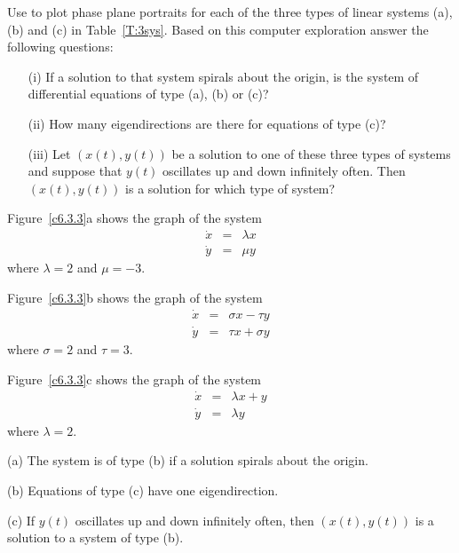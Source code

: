 \documentclass{ximera}
\begin{document}
\begin{computerExercise} \label{c6.3.3}
Use {\pplane} to plot phase plane portraits for each of the
three types of linear systems (a), (b) and (c) in Table~\ref{T:3sys}.
Based on this computer exploration answer the following questions:
\begin{itemize}
\item[(i)]  If a solution to that system spirals about the origin,
is the system of differential equations of type (a), (b) or (c)?
\item[(ii)]  How many eigendirections are there for equations of type (c)?
\item[(iii)]  Let $(x(t),y(t))$ be a solution to one of these three types of
systems and suppose that $y(t)$ oscillates up and down infinitely often.
Then $(x(t),y(t))$ is a solution for which type of system?
\end{itemize}

\begin{solution}
Figure~\ref{c6.3.3}a shows the graph of the system
\[ 
\begin{array}{rrr}
\dot{x} & = & \lambda x \\ 
\dot{y} & = & \mu y \end{array} 
\]
where $\lambda = 2$ and $\mu = -3$.

\para Figure~\ref{c6.3.3}b shows the graph of the system
\[ 
\begin{array}{rrr}
\dot{x} & = & \sigma x - \tau y \\
\dot{y} & = & \tau x + \sigma y \end{array} 
\]
where $\sigma = 2$ and $\tau = 3$.

\para Figure~\ref{c6.3.3}c shows the graph of the system
\[ 
\begin{array}{rrr}
\dot{x} & = & \lambda x + y \\
\dot{y} & = & \lambda y \end{array} 
\]
where $\lambda = 2$.

(a) The system is of type (b) if a solution spirals about the origin.

(b) Equations of type (c) have one eigendirection.

(c) If $y(t)$ oscillates up and down infinitely often, then
$(x(t),y(t))$ is a solution to a system of type (b).


\end{solution}
\end{computerExercise}
\end{document}

